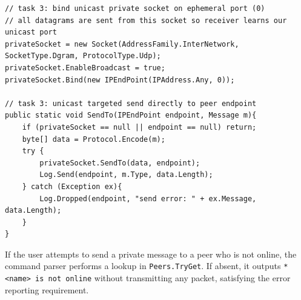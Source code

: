 \documentclass[11pt,a4paper]{article}
\begin{document}
\begin{lstlisting}[language={[Sharp]C}, caption={Task 3: Ephemeral private socket creation and targeted send in Net.cs.}]
// task 3: bind unicast private socket on ephemeral port (0)
// all datagrams are sent from this socket so receiver learns our unicast port
privateSocket = new Socket(AddressFamily.InterNetwork, SocketType.Dgram, ProtocolType.Udp);
privateSocket.EnableBroadcast = true;
privateSocket.Bind(new IPEndPoint(IPAddress.Any, 0));

// task 3: unicast targeted send directly to peer endpoint
public static void SendTo(IPEndPoint endpoint, Message m){
    if (privateSocket == null || endpoint == null) return;
    byte[] data = Protocol.Encode(m);
    try {
        privateSocket.SendTo(data, endpoint);
        Log.Send(endpoint, m.Type, data.Length);
    } catch (Exception ex){
        Log.Dropped(endpoint, "send error: " + ex.Message, data.Length);
    }
}
\end{lstlisting}

If the user attempts to send a private message to a peer who is not online, the command parser performs a lookup in \texttt{Peers.TryGet}. If absent, it outputs \texttt{* <name> is not online} without transmitting any packet, satisfying the error reporting requirement.
\end{document}
